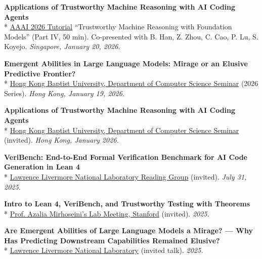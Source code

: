 \documentclass{article}
\newenvironment{changemargin}[2]{%
  \begin{list}{}{%
    \setlength{\topsep}{0pt}%
    \setlength{\leftmargin}{#1}%
    \setlength{\rightmargin}{#2}%
    \setlength{\listparindent}{\parindent}%
    \setlength{\itemindent}{\parindent}%
    \setlength{\parsep}{\parskip}%
  }%
  \item[]}{\end{list}
}
\newenvironment{body} {
		\vspace*{-16pt}
		\begin{changemargin}{-0.25in}{-0.5in}
	  }
		{\end{changemargin}\vspace{8pt plus 12pt}
	}
\begin{document}
\begin{body}
    \vspace{12pt}

    \textbf{Applications of Trustworthy Machine Reasoning with AI Coding Agents}\\*
    \href{https://trustworthy-machine-reasoning.github.io/}{AAAI 2026 Tutorial} ``Trustworthy Machine Reasoning with Foundation Models'' (Part IV, 50 min). Co-presented with B. Han, Z. Zhou, C. Cao, P. Lu, S. Koyejo. \emph{Singapore, January 20, 2026.}

    \vspace{8pt}
    \textbf{Emergent Abilities in Large Language Models: Mirage or an Elusive Predictive Frontier?}\\*
    \href{https://docs.google.com/presentation/d/1J29Rt6C7g8uh6aWUJUIUtuZHdU0ihrWMi8C66XJn9jw/edit?usp=sharing}{Hong Kong Baptist University, Department of Computer Science Seminar} (2026 Series). \emph{Hong Kong, January 19, 2026.}

    \vspace{8pt}
    \textbf{Applications of Trustworthy Machine Reasoning with AI Coding Agents}\\*
    \href{https://docs.google.com/presentation/d/1oHnxUTewe0k9h-SL8RExViJVOUcEPnWmPD_VbD4EzJ0/edit?usp=sharing}{Hong Kong Baptist University, Department of Computer Science Seminar} (invited). \emph{Hong Kong, January 2026.}

    \vspace{8pt}
    \textbf{VeriBench: End-to-End Formal Verification Benchmark for AI Code Generation in Lean 4}\\*
    \href{https://docs.google.com/presentation/d/11w7Q9wbfimfs0e87XuLagkhj7Q1lk8Wq-ASM-xJVHdg/edit?usp=sharing}{Lawrence Livermore National Laboratory Reading Group} (invited). \emph{July 31, 2025.}

    \vspace{8pt}
    \textbf{Intro to Lean 4, VeriBench, and Trustworthy Testing with Theorems}\\*
    \href{https://docs.google.com/presentation/d/1KRBym-sOORaxszOJQHdD4u80wAl7jHy8Pda0KAcdeZw/edit?usp=sharing}{Prof. Azalia Mirhoseini's Lab Meeting, Stanford} (invited). \emph{2025.}

    \vspace{8pt}
    \textbf{Are Emergent Abilities of Large Language Models a Mirage? --- Why Has Predicting Downstream Capabilities Remained Elusive?}\\*
    \href{https://docs.google.com/presentation/d/1cr_X6jzZxShHMUVjzHAkitCnPZCbBfyxxxgZg8S90SI/edit?usp=sharing}{Lawrence Livermore National Laboratory} (invited talk). \emph{2025.}


\end{body}
\end{document}
